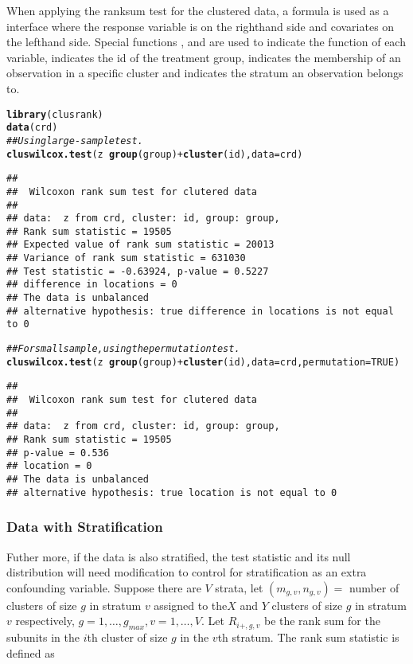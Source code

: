 \documentclass[nojss]{jss}\usepackage[]{graphicx}\usepackage[]{color}
\makeatletter
\newcommand{\hlnum}[1]{\textcolor[rgb]{0.686,0.059,0.569}{#1}}%
\newcommand{\hlcom}[1]{\textcolor[rgb]{0.678,0.584,0.686}{\textit{#1}}}%
\newcommand{\hlopt}[1]{\textcolor[rgb]{0,0,0}{#1}}%
\newcommand{\hlstd}[1]{\textcolor[rgb]{0.345,0.345,0.345}{#1}}%
\newcommand{\hlkwc}[1]{\textcolor[rgb]{0.333,0.667,0.333}{#1}}%
\newcommand{\hlkwd}[1]{\textcolor[rgb]{0.737,0.353,0.396}{\textbf{#1}}}%
\newenvironment{kframe}{%
 \def\at@end@of@kframe{}%
 \ifinner\ifhmode%
  \def\at@end@of@kframe{\end{minipage}}%
  \begin{minipage}{\columnwidth}%
 \fi\fi%
 \def\FrameCommand##1{\hskip\@totalleftmargin \hskip-\fboxsep
 \colorbox{shadecolor}{##1}\hskip-\fboxsep
     \hskip-\linewidth \hskip-\@totalleftmargin \hskip\columnwidth}%
 \MakeFramed {\advance\hsize-\width
   \@totalleftmargin\z@ \linewidth\hsize
   \@setminipage}}%
 {\par\unskip\endMakeFramed%
 \at@end@of@kframe}
\newenvironment{knitrout}{}{} %
\makeatother
\begin{document}
When applying the ranksum test for the clustered data,
a formula is used as a interface where the response
variable is on the righthand side and covariates on
the lefthand side. Special functions ,
 and  are used to indicate
the function of each variable,  indicates
the id of the treatment group,  indicates
the membership of an observation in a specific cluster
and  indicates the stratum an observation
belongs to.

\begin{knitrout}
\color{fgcolor}\begin{kframe}
\begin{alltt}
\hlkwd{library}\hlstd{(clusrank)}
\hlkwd{data}\hlstd{(crd)}
\hlcom{## Using large-sample test.}
\hlkwd{cluswilcox.test}\hlstd{(z} \hlopt{~} \hlkwd{group}\hlstd{(group)} \hlopt{+} \hlkwd{cluster}\hlstd{(id),} \hlkwc{data} \hlstd{= crd)}
\end{alltt}
\begin{verbatim}
## 
## 	Wilcoxon rank sum test for clutered data
## 
## data:  z from crd, cluster: id, group: group,
## Rank sum statistic = 19505
## Expected value of rank sum statistic = 20013
## Variance of rank sum statistic = 631030
## Test statistic = -0.63924, p-value = 0.5227
## difference in locations = 0
## The data is unbalanced
## alternative hypothesis: true difference in locations is not equal to 0
\end{verbatim}
\begin{alltt}
\hlcom{## For small sample, using the permutation test.}
\hlkwd{cluswilcox.test}\hlstd{(z} \hlopt{~} \hlkwd{group}\hlstd{(group)} \hlopt{+} \hlkwd{cluster}\hlstd{(id),} \hlkwc{data} \hlstd{= crd,} \hlkwc{permutation} \hlstd{=} \hlnum{TRUE}\hlstd{)}
\end{alltt}
\begin{verbatim}
## 
## 	Wilcoxon rank sum test for clutered data
## 
## data:  z from crd, cluster: id, group: group,
## Rank sum statistic = 19505
## p-value = 0.536
## location = 0
## The data is unbalanced
## alternative hypothesis: true location is not equal to 0
\end{verbatim}
\end{kframe}
\end{knitrout}


\subsubsection{Data with Stratification}
Futher more, if the data is also stratified,
the test statistic and its null distribution will
need modification to control for stratification as
an extra
confounding variable.
Suppose there are $V$ strata,
let $(m_{g,v}, n_{g,v})=$ number of clusters of size $g$
in stratum $v$ assigned to the$X$ and $Y$ clusters of size $g$
in stratum $v$ respectively,
$g = 1, \ldots, g_{max}, v = 1, \ldots, V$.
Let $R_{i+, g, v}$ be the rank sum for the subunits in the
$i$th cluster of size $g$ in the $v$th stratum.
The rank sum statistic is defined as
\end{document}
